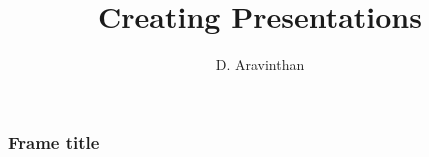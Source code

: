 \documentclass{beamer}
\title{Creating Presentations}
\author{D. Aravinthan}
\begin{document}
\begin{frame}
  \titlepage
\end{frame}
\begin{frame}
\frametitle{Frame title}
\blindtext
\end{frame}
\begin{comment}
\begin{frame}
\frametitle{Colored Boxes}
\orangebox{Theorem Orange}{If you use the orangebox command, the box will be orange.}
\end{frame}
\begin{frame}
\frametitle{Colored Boxes}
\orangebox{Theorem Orange.}{If you use the orangebox command, the box will be orange.}

\greenbox{Theorem Green.}{If you use the greenbox command, the box will be green.}

\bluebox{Theorem Blue.}{If you use the bluebox command, the box will be blue.}

\graybox{Theorem Gray.}{If you use the graybox command, the box will be gray.}

\grassgreenbox{Theorem Grass Green.}{If you use the grassgreen box command, the box will be grass green.}


\end{comment}
\end{document}
